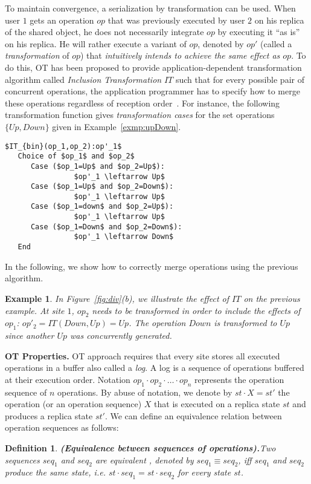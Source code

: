 \documentclass[submission,copyright,creativecommons]{eptcs}
\newtheorem{example}{Example}
\newtheorem{definition}{Definition}
\begin{document}
To maintain convergence, a serialization by transformation can be used. When  user $1$  gets an operation $op$ that
was previously executed  by  user $2$ on  his replica of the
shared  object,   he  does  not  necessarily  integrate $op$  by
executing it  ``as is''   on  his replica. He will rather  execute a
variant  of $op$,  denoted by  $op'$ (called  a \emph{transformation} of
$op$) that  \textit{intuitively intends to achieve the  same effect as
  $op$}.
 To do this, OT has been proposed to provide
application-dependent  transformation algorithm called
\emph{Inclusion Transformation} $IT$ such  that for  every
possible pair of concurrent operations, the application programmer has to
specify  how to  merge these  operations regardless  of  reception 
order~\cite{Ellis89,Sun98,Sun.ea:98}.
For instance, the following transformation function gives \textit{transformation cases} for the set operations $\{Up,Down\}$ given in Example~\ref{exmp:upDown}.\begin{small}
\begin{lstlisting}
$IT_{bin}(op_1,op_2):op'_1$
   Choice of $op_1$ and $op_2$
      Case ($op_1=Up$ and $op_2=Up$):
                $op'_1 \leftarrow Up$
      Case ($op_1=Up$ and $op_2=Down$):
                $op'_1 \leftarrow Up$
      Case ($op_1=down$ and $op_2=Up$):
                $op'_1 \leftarrow Up$
      Case ($op_1=Down$ and $op_2=Down$):
                $op'_1 \leftarrow Down$
   End
\end{lstlisting}
\end{small}


\medskip
In the following, we show how to correctly merge operations using the previous algorithm. 
\begin{example}\label{exmp:e12}
In Figure~\ref{fig:div}(b),  we illustrate the effect of  $IT$ on the
previous example. At site $1$, $op_2$ needs
to    be    transformed   in order to include the effects of $op_1$:
$op'_2=IT(Down,Up) =Up$.  The  operation $Down$ is transformed to $Up$ since another  $Up$ was concurrently generated.
\end{example}  





\noindent\textbf{OT Properties.} 
OT approach requires that every site stores all executed operations in a buffer also called a \emph{log}. A log is a sequence of operations buffered at their execution order.
Notation $op_1\cdot op_2\cdot \ldots\cdot op_n$ represents the operation sequence of $n$ operations.
By abuse of notation, we denote by $st\cdot X = st'$ the operation (or an operation sequence)
$X$ that is executed
on a replica state $st$ and produces a replica state $st'$.  We can define an equivalence
relation between operation sequences as follows:
\begin{definition}\textbf{\emph{(Equivalence between sequences of operations).}}\label{Def:tequiv}
Two sequences $seq_1$ and $seq_2$ are \emph{equivalent }, denoted by
$seq_1 \equiv seq_2$, iff  
 $seq_1$ and $seq_2$ produce the same state, \textit{i.e.} $st\cdot seq_1 = st\cdot seq_2$ for every state $st$. 
\end{definition}
\end{document}
